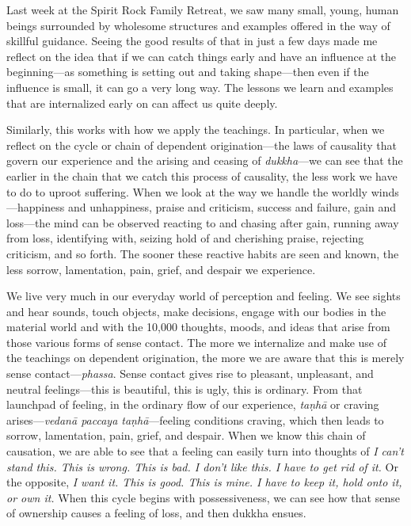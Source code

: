 
Last week at the Spirit Rock Family Retreat, we saw many small, young, 
human beings surrounded by wholesome structures and examples offered in 
the way of skillful guidance. Seeing the good results of that in just a 
few days made me reflect on the idea that if we can catch things early 
and have an influence at the beginning---as something is setting out 
and taking shape---then even if the influence is small, it can go a 
very long way. The lessons we learn and examples that are internalized 
early on can affect us quite deeply.

Similarly, this works with how we apply the teachings. In particular, 
when we reflect on the cycle or chain of dependent origination---the 
laws of causality that govern our experience and the arising and 
ceasing of \emph{dukkha}---we can see that the earlier in the chain 
that we catch this process of causality, the less work we have to do to 
uproot suffering. When we look at the way we handle the worldly 
winds---happiness and unhappiness, praise and criticism, success and 
failure, gain and loss---the mind can be observed reacting to and 
chasing after gain, running away from loss, identifying with, seizing 
hold of and cherishing praise, rejecting criticism, and so forth. The 
sooner these reactive habits are seen and known, the less sorrow, 
lamentation, pain, grief, and despair we experience.

We live very much in our everyday world of perception and feeling. We 
see sights and hear sounds, touch objects, make decisions, engage with 
our bodies in the material world and with the 10,000 thoughts, moods, 
and ideas that arise from those various forms of sense contact. The 
more we internalize and make use of the teachings on dependent 
origination, the more we are aware that this is merely sense 
contact---\emph{phassa}. Sense contact gives rise to pleasant, 
unpleasant, and neutral feelings---this is beautiful, this is ugly, 
this is ordinary. From that launchpad of feeling, in the ordinary flow 
of our experience, \emph{taṇhā} or craving arises---\emph{vedanā 
paccaya taṇhā}---feeling conditions craving, which then leads to 
sorrow, lamentation, pain, grief, and despair. When we know this chain 
of causation, we are able to see that a feeling can easily turn into 
thoughts of \emph{I can't stand this. This is wrong. This is bad. I 
don't like this. I have to get rid of it.} Or the opposite, \emph{I 
want it. This is good. This is mine. I have to keep it, hold onto it, 
or own it.} When this cycle begins with possessiveness, we can see how 
that sense of ownership causes a feeling of loss, and then dukkha 
ensues.

